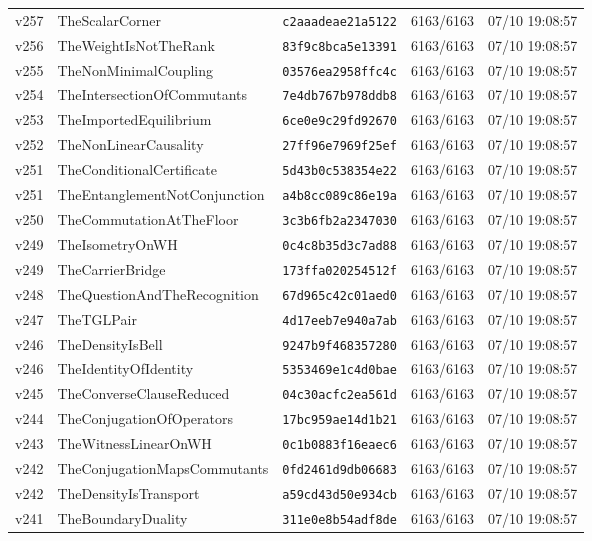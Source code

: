 \documentclass[11pt]{article}
\theoremstyle{definition}\newtheorem{deriv}{Derivação}
\begin{document}
{\begin{longtable}{@{}lllll@{}}
v257 & TheScalarCorner & \texttt{c2aaadeae21a5122} & 6163/6163 & 07/10 19:08:57 \\
v256 & TheWeightIsNotTheRank & \texttt{83f9c8bca5e13391} & 6163/6163 & 07/10 19:08:57 \\
v255 & TheNonMinimalCoupling & \texttt{03576ea2958ffc4c} & 6163/6163 & 07/10 19:08:57 \\
v254 & TheIntersectionOfCommutants & \texttt{7e4db767b978ddb8} & 6163/6163 & 07/10 19:08:57 \\
v253 & TheImportedEquilibrium & \texttt{6ce0e9c29fd92670} & 6163/6163 & 07/10 19:08:57 \\
v252 & TheNonLinearCausality & \texttt{27ff96e7969f25ef} & 6163/6163 & 07/10 19:08:57 \\
v251 & TheConditionalCertificate & \texttt{5d43b0c538354e22} & 6163/6163 & 07/10 19:08:57 \\
v251 & TheEntanglementNotConjunction & \texttt{a4b8cc089c86e19a} & 6163/6163 & 07/10 19:08:57 \\
v250 & TheCommutationAtTheFloor & \texttt{3c3b6fb2a2347030} & 6163/6163 & 07/10 19:08:57 \\
v249 & TheIsometryOnWH & \texttt{0c4c8b35d3c7ad88} & 6163/6163 & 07/10 19:08:57 \\
v249 & TheCarrierBridge & \texttt{173ffa020254512f} & 6163/6163 & 07/10 19:08:57 \\
v248 & TheQuestionAndTheRecognition & \texttt{67d965c42c01aed0} & 6163/6163 & 07/10 19:08:57 \\
v247 & TheTGLPair & \texttt{4d17eeb7e940a7ab} & 6163/6163 & 07/10 19:08:57 \\
v246 & TheDensityIsBell & \texttt{9247b9f468357280} & 6163/6163 & 07/10 19:08:57 \\
v246 & TheIdentityOfIdentity & \texttt{5353469e1c4d0bae} & 6163/6163 & 07/10 19:08:57 \\
v245 & TheConverseClauseReduced & \texttt{04c30acfc2ea561d} & 6163/6163 & 07/10 19:08:57 \\
v244 & TheConjugationOfOperators & \texttt{17bc959ae14d1b21} & 6163/6163 & 07/10 19:08:57 \\
v243 & TheWitnessLinearOnWH & \texttt{0c1b0883f16eaec6} & 6163/6163 & 07/10 19:08:57 \\
v242 & TheConjugationMapsCommutants & \texttt{0fd2461d9db06683} & 6163/6163 & 07/10 19:08:57 \\
v242 & TheDensityIsTransport & \texttt{a59cd43d50e934cb} & 6163/6163 & 07/10 19:08:57 \\
v241 & TheBoundaryDuality & \texttt{311e0e8b54adf8de} & 6163/6163 & 07/10 19:08:57 \\

\end{longtable}}
\end{document}
